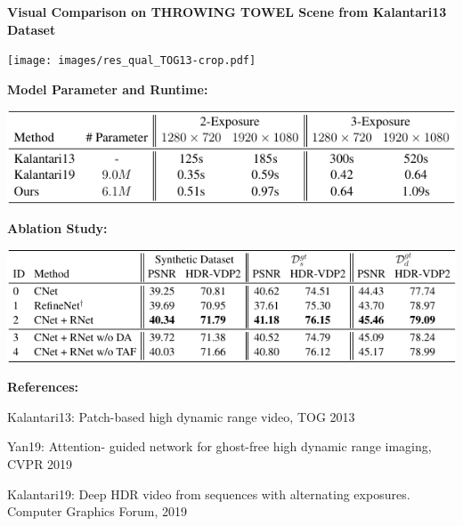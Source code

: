 \documentclass[landscape,a0paper,fontscale=0.292]{baposter}
\newcommand{\headercolor}{white}
\newcommand{\subheadercolor}{black}
\begin{document}
\begin{poster}
{    \vspace{0.3em}
    \begin{minipage}[t]{0.65\linewidth}
        \textbf{\color{\subheadercolor}Visual Comparison on THROWING TOWEL Scene from Kalantari13 Dataset}
        \vspace{-0.8em}
        \begin{center}
            \texttt{[image: images/res\_qual\_TOG13-crop.pdf]}
        \end{center}
    \end{minipage}
    \hfill
    \begin{minipage}[t]{0.34\linewidth}
        \textbf{\color{\subheadercolor}Model Parameter and Runtime:}
        \vspace{-0.4em}
        \begin{center}
            \includegraphics[width=\textwidth]{images/runtime-crop.pdf}
        \end{center}
        
        \vspace{-0.5em}
        \textbf{\color{\subheadercolor}Ablation Study:}
        \vspace{-0.5em}
        \begin{center}
            \includegraphics[width=\textwidth]{images/ablation_study-crop.pdf}
        \end{center}

        \vspace{-0.5em}
        \textbf{\color{\headercolor}References:}
        \begin{enumerate}[leftmargin=*,label={[\arabic*]}]
            \tiny
            \item Kalantari13: Patch-based high dynamic range video, TOG 2013
            \item Yan19: Attention- guided network for ghost-free high dynamic range imaging, CVPR 2019
            \item Kalantari19: Deep HDR video from sequences with alternating exposures. Computer Graphics Forum, 2019
        \end{enumerate}
    \end{minipage}
    
}

\end{poster}
\end{document}
